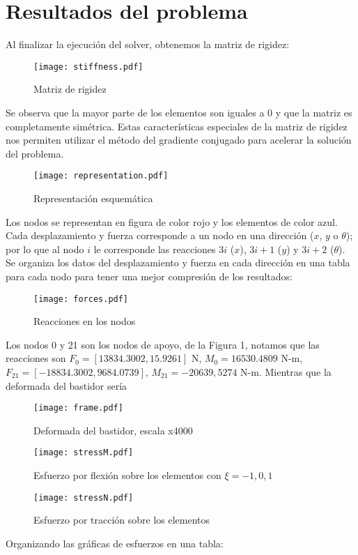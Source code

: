 \documentclass[10pt,a4paper]{article}
\begin{document}
\section{Resultados del problema}
Al finalizar la ejecución del solver, obtenemos la matriz de rigidez:
\begin{figure}[H]
    \centering
    \texttt{[image: stiffness.pdf]}
    \caption{Matriz de rigidez}
\end{figure}
Se observa que la mayor parte de los elementos son iguales a 0 y que la matriz es completamente simétrica. Estas características especiales de la matriz de rigidez nos permiten utilizar el método del gradiente conjugado para acelerar la solución del problema.
\begin{figure}[H]
    \centering
    \texttt{[image: representation.pdf]}
    \caption{Representación esquemática}
\end{figure}
Los nodos se representan en figura de color {\color{red} rojo} y los elementos de color {\color{blue} azul}.
\newpage
Cada desplazamiento y fuerza corresponde a un nodo en una dirección ($x$, $y$ o $\theta$); por lo que al nodo $i$ le corresponde las reacciones $3i$ ($x$), $3i+1$ ($y$) y $3i+2$ ($\theta$). Se organiza los datos del desplazamiento y fuerza en cada dirección en una tabla para cada nodo para tener una mejor compresión de los resultados:
\begin{figure}[H]
    \centering
    \texttt{[image: forces.pdf]}
    \caption{Reacciones en los nodos}
\end{figure}
Los nodos 0 y 21 son los nodos de apoyo, de la Figura 1, notamos que las reacciones son {\large $F_{0} = [13834.3002, 15.9261]$ N, $M_{0} = 16530.4809$ N-m, $F_{21} = [-18834.3002, 9684.0739]$, $M_{21} = -20639,5274$ N-m.}
\newpage
Mientras que la deformada del bastidor sería
\begin{figure}[H]
    \centering
    \texttt{[image: frame.pdf]}
    \caption{Deformada del bastidor, escala x4000}
\end{figure}
\begin{figure}[H]
    \centering
    \texttt{[image: stressM.pdf]}
    \caption{Esfuerzo por flexión sobre los elementos con $\xi=-1,0,1$}
\end{figure}
\begin{figure}[H]
    \centering
    \texttt{[image: stressN.pdf]}
    \caption{Esfuerzo por tracción sobre los elementos}
\end{figure}
Organizando las gráficas de esfuerzos en una tabla:
\end{document}
